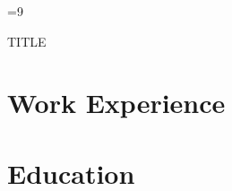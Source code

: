 \documentclass[10pt]{article}
\begin{document}
    \color{body}

    =9\relax     %

        \begin{minipage}[t]{\textwidth}
            TITLE
        \end{minipage}

        \begin{minipage}[t]{0.6\textwidth}
            \vspace{0pt}

            \section{Work Experience}

            

        \end{minipage}
        \hfill
        \begin{minipage}[t]{0.35\textwidth}
            \vspace{0pt}

            \section{Education}

            

            
        \end{minipage}
\end{document}
